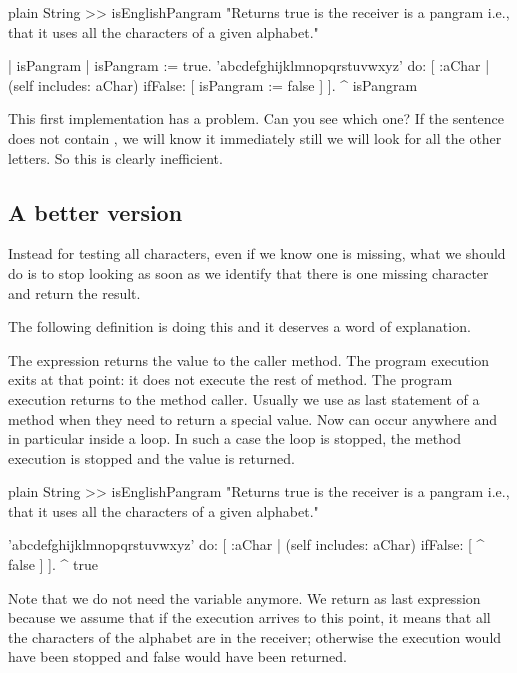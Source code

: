 \documentclass[10pt,twoside,english]{_support/latex/sbabook/sbabook}
\begin{document}
\begin{displaycode}{plain}
String >> isEnglishPangram
	"Returns true is the receiver is a pangram i.e., that it uses all the characters of a given alphabet."
	
	| isPangram |
	isPangram := true. 
	'abcdefghijklmnopqrstuvwxyz' do: [ :aChar |
		(self includes: aChar)
			ifFalse: [ isPangram := false ]
		].
	^ isPangram
\end{displaycode}

This first implementation has a problem. Can you see which one? 
If the sentence does not contain , we will know it immediately still we will look for all the other letters. So this is clearly inefficient.
\subsection{A better version}
Instead for testing all characters, even if we know one is missing, what we should do is to stop looking as soon as we identify that there is one missing character and return the result. 

The following definition is doing this and it deserves a word of explanation. 

The expression   returns the value  to the caller method. The program execution exits at that point: it does not execute the rest of method. The program execution returns to the method caller. Usually we use  as last statement of a method when they need to return a special value. Now  can occur anywhere and in particular inside a loop. In such a case the loop is stopped, the method execution is stopped and the value is returned. 

\begin{displaycode}{plain}
String >> isEnglishPangram
	"Returns true is the receiver is a pangram i.e., that it uses all the characters of a given alphabet."
	
	'abcdefghijklmnopqrstuvwxyz' do: [ :aChar |
		(self includes: aChar)
			ifFalse: [ ^ false ]
		].
	^ true
\end{displaycode}

Note that we do not need the variable  anymore. We return  as last expression because we assume that if the execution arrives to this point, it means that all the characters of the alphabet are in the receiver; otherwise the execution would have been stopped and false would have been returned.
\end{document}

